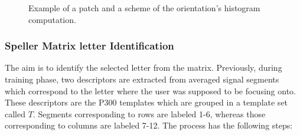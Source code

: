 \documentclass[entropy,article,submit,moreauthors,pdftex,10pt,a4paper]{mdpi}
\begin{document}
 
\begin{figure}[H]
\centering
{}
\caption{ Example of a patch and a scheme of the orientation's histogram computation.}
\label{fig:sampledescriptor}
\end{figure}

\subsubsection{Speller Matrix letter Identification}
\label{Classification}


The aim is to identify the selected letter from the matrix. Previously, during training phase, two descriptors are extracted from averaged signal segments which correspond to the letter where the user was supposed to be focusing onto.  These descriptors are the P300 templates which are grouped in a template set called $ T $.  Segments corresponding to rows are labeled 1-6, whereas those corresponding to columns are labeled 7-12.  The process has the following steps:
\end{document}

